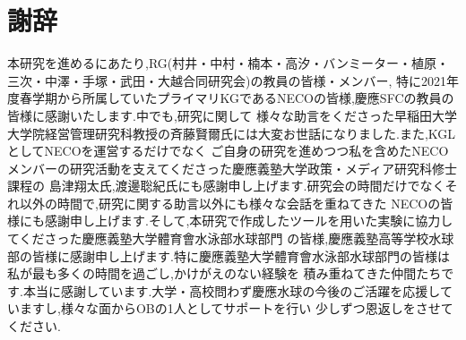 \documentclass[../main.tex]{subfiles}
\begin{document}
\chapter*{謝辞}

本研究を進めるにあたり,RG(村井・中村・楠本・高汐・バンミーター・植原・三次・中澤・手塚・武田・大越合同研究会)の教員の皆様・メンバー,
特に2021年度春学期から所属していたプライマリKGであるNECOの皆様,慶應SFCの教員の皆様に感謝いたします.中でも,研究に関して
様々な助言をくださった早稲田大学大学院経営管理研究科教授の斉藤賢爾氏には大変お世話になりました.また,KGLとしてNECOを運営するだけでなく
ご自身の研究を進めつつ私を含めたNECOメンバーの研究活動を支えてくださった慶應義塾大学政策・メディア研究科修士課程の
島津翔太氏,渡邊聡紀氏にも感謝申し上げます.研究会の時間だけでなくそれ以外の時間で,研究に関する助言以外にも様々な会話を重ねてきた
NECOの皆様にも感謝申し上げます.そして,本研究で作成したツールを用いた実験に協力してくださった慶應義塾大学體育會水泳部水球部門
の皆様,慶應義塾高等学校水球部の皆様に感謝申し上げます.特に慶應義塾大学體育會水泳部水球部門の皆様は私が最も多くの時間を過ごし,かけがえのない経験を
積み重ねてきた仲間たちです.本当に感謝しています.大学・高校問わず慶應水球の今後のご活躍を応援していますし,様々な面からOBの1人としてサポートを行い
少しずつ恩返しをさせてください.
\end{document}
